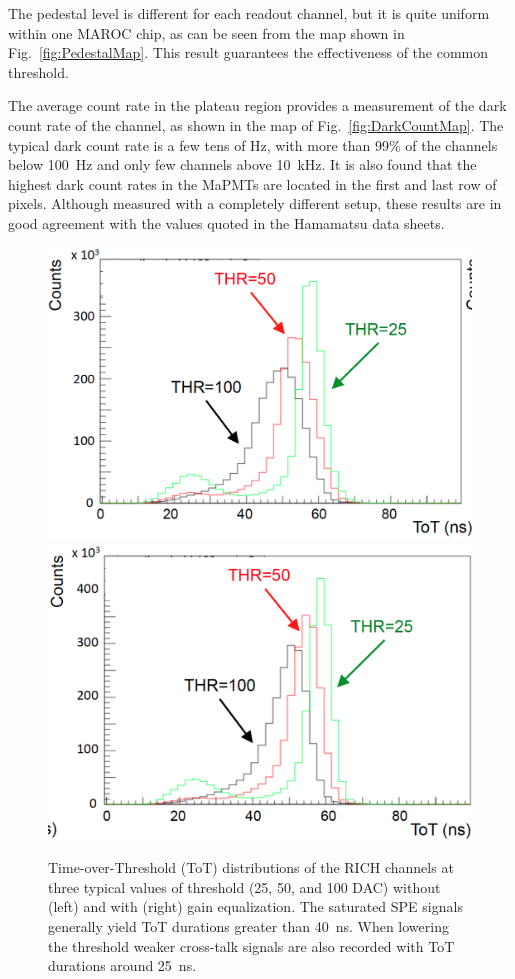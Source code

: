 \documentclass[5p,times,twocolumn]{elsarticle}
\begin{document}
The pedestal level is different for each readout channel, but it is quite uniform within one MAROC chip, as can be
seen from the map shown in Fig.~\ref{fig:PedestalMap}. This result guarantees the effectiveness of the common
threshold.

The average count rate in the plateau region provides a measurement of the dark count rate of the channel, as shown
in the map of Fig.~\ref{fig:DarkCountMap}. The typical dark count rate is a few tens of Hz, with more than 99\% of
the channels below 100~Hz and only few channels above 10~kHz. It is also found that the highest dark count rates in
the MaPMTs are located in the first and last row of pixels. Although measured with a completely different setup,
these results are in good agreement with the values quoted in the Hamamatsu data sheets.

\begin{figure}[t]
\begin{center}
\includegraphics[width=0.95\columnwidth]{Equalize_before.png}
\includegraphics[width=0.95\columnwidth]{Equalize_after.png}
\end{center}
\caption{Time-over-Threshold (ToT) distributions of the RICH channels at three typical values of threshold (25, 50,
  and 100 DAC) without (left) and with (right) gain equalization. The saturated SPE signals generally yield ToT durations
  greater than 40~ns. When lowering the threshold weaker cross-talk signals are also recorded with ToT durations
  around 25~ns.}
\label{Fig:Equali}
\end{figure}
\end{document}
